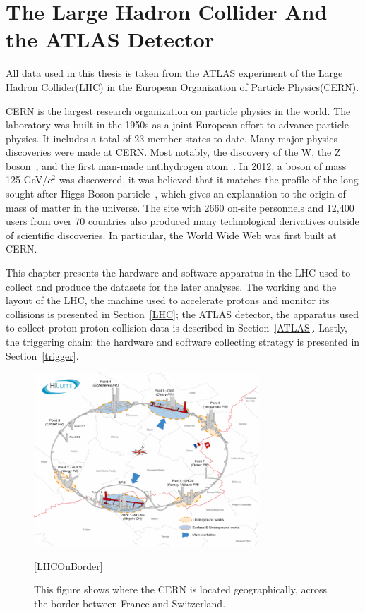 \chapter{The Large Hadron Collider And the ATLAS Detector}
\label{chapter:ATLAS}

All data used in this thesis is taken from the ATLAS experiment of the Large Hadron Collider(LHC) in the European Organization of Particle Physics(CERN).

CERN is the largest research organization on particle physics in the world. The laboratory was built in the 1950s as a joint European effort to advance particle physics. It includes a total of 23 member states to date. Many major physics discoveries were made at CERN. Most notably, the discovery of the W, the Z boson~\cite{hioki1982does}, and the first man-made antihydrogen atom~\cite{hioki1982does}. In 2012, a boson of mass 125 GeV/$c^{2}$ was discovered, it was believed that it matches the profile of the long sought after Higgs Boson
particle~\cite{chatrchyan2012observation}, which gives an explanation to the origin of mass of matter in the universe. The site with 2660 on-site personnels and 12,400 users from over 70 countries also produced many technological derivatives outside of scientific discoveries. In particular, the World Wide Web was first built at CERN.

This chapter presents the hardware and software apparatus in the LHC used to collect and produce the datasets for the later analyses.
The working and the layout of the LHC, the machine used to accelerate protons and monitor its collisions is presented in Section~\ref{LHC}; the ATLAS detector, the apparatus used to collect proton-proton collision data is described in Section~\ref{ATLAS}. Lastly, the triggering chain: the hardware and software collecting strategy is presented in Section~\ref{trigger}.

\begin{figure}[!htb]
    \begin{center}
        \includegraphics[width=0.75\textwidth]{figures/chapter_ATLAS/LHCOnBorder}
        \caption{
			This figure shows where the CERN is located geographically, across the border between France and Switzerland. \cite{Brüning:782076} 
        }
        \label{fig:CERNAcceleratorComplex}
        \ref{LHCOnBorder}
    \end{center}
\end{figure}

